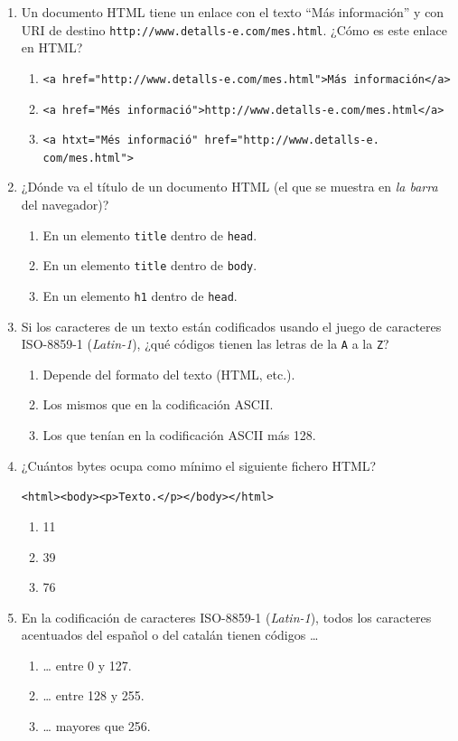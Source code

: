 \begin{enumerate}
\item Un documento HTML tiene un enlace con el texto ``Más información'' y con URI de destino \verb|http://www.detalls-e.com/mes.html|. ¿Cómo es este enlace en HTML? \begin{enumerate} \item \verb|<a href="http://www.detalls-e.com/mes.html">Más información</a>| \item \verb|<a href="Més informació">http://www.detalls-e.com/mes.html</a>| \item \verb|<a htxt="Més informació" href="http://www.detalls-e.| \verb|com/mes.html">| \end{enumerate} 

\item ¿Dónde va el título de un documento HTML (el que se muestra en \emph{la barra} del navegador)? \begin{enumerate} \item En un elemento \verb|title| dentro de \verb|head|. \item En un elemento \verb|title| dentro de \verb|body|. \item En un elemento \verb|h1| dentro de \verb|head|. \end{enumerate} 

\item Si los caracteres de un texto están codificados usando el juego de caracteres ISO-8859-1 (\emph{Latin-1}), ¿qué códigos tienen las letras de la \verb|A| a la \verb|Z|? \begin{enumerate} \item Depende del formato del texto (HTML, etc.). \item Los mismos que en la codificación ASCII. \item Los que tenían en la codificación ASCII más 128. \end{enumerate} 

\item ¿Cuántos bytes ocupa como mínimo el siguiente fichero HTML? \begin{center} \verb|<html><body><p>Texto.</p></body></html>| \end{center} \begin{enumerate} \item 11 \item 39 \item 76 \end{enumerate} 

\item En la codificación de caracteres ISO-8859-1 (\emph{Latin-1}), todos los caracteres acentuados del español o del catalán tienen códigos {\ldots} \begin{enumerate} \item {\ldots} entre 0 y 127. \item {\ldots} entre 128 y 255. \item {\ldots} mayores que 256. \end{enumerate} 


\end{enumerate}
